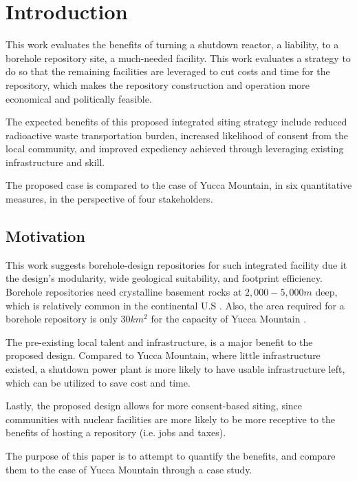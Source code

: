 \section{Introduction}

This work evaluates the benefits of turning a shutdown reactor,
a liability, to a borehole repository site, a much-needed facility.
This work evaluates a strategy to do so that the remaining facilities
are leveraged to cut costs and time for the repository, which makes
the repository construction and operation more economical and 
politically feasible. 

The  expected benefits of this 
proposed integrated siting strategy include reduced radioactive waste 
transportation burden, increased likelihood of consent from the local 
community, and improved expediency achieved through leveraging existing 
infrastructure and skill.

The proposed case is compared to the case of Yucca Mountain, in six
quantitative measures, in the perspective of four stakeholders.

\subsection{Motivation}
This work suggests borehole-design repositories for such integrated facility due it 
the design's modularity, wide geological suitability, and footprint 
efficiency. Borehole repositories need crystalline basement rocks at 
$ 2,000 - 5,000m$ deep, which is relatively common in the continental 
U.S \cite{arnold_research_2012}. Also, the area required for a 
borehole repository is only $30 km^2$ for the capacity of Yucca Mountain
 \cite{brady_deep_2009}.
 
The pre-existing local talent and infrastructure, is a major
benefit to the proposed design. Compared to Yucca Mountain, where little 
infrastructure existed, a shutdown power plant is more likely to have
usable infrastructure left, which can be utilized to save cost and time.

Lastly, the proposed design allows for more consent-based siting, 
since communities with nuclear facilities are more likely to be 
more receptive to the benefits of hosting a repository (i.e. jobs and taxes). 

The purpose of this paper is to attempt to quantify the benefits, and compare
them to the case of Yucca Mountain through a case study.
